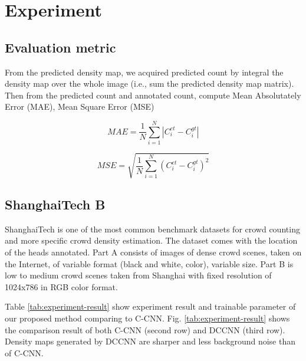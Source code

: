 \section{Experiment} \label{sec:experiment}

\subsection{Evaluation metric}


From the predicted density map, we acquired predicted count by integral the density map over the whole image (i.e., sum the predicted density map matrix). Then from the predicted count and annotated count, compute Mean Absolutately Error (MAE), Mean Square Error (MSE) 

\begin{equation}M A E=\frac{1}{N} \sum_{i=1}^{N}\left|C_{i}^{e t}-C_{i}^{g t}\right|\end{equation}

\begin{equation}M S E=\sqrt{\frac{1}{N} \sum_{i=1}^{N}\left(C_{i}^{e t}-C_{i}^{g t}\right)^{2}}\end{equation}

\subsection{ShanghaiTech B} \label{sec:shb_result}
 


ShanghaiTech \cite{zhang2016single} is one of the most common benchmark datasets for crowd counting and more specific crowd density estimation. The dataset comes with the location of the heads annotated. Part A consists of images of dense crowd scenes, taken on the Internet, of variable format (black and white, color), variable size. Part B is low to medium crowd scenes taken from Shanghai with fixed resolution of 1024x786 in RGB color format. 

Table \ref{tab:experiment-result} show experiment result and trainable parameter of our proposed method comparing to C-CNN. Fig. \ref{tab:experiment-result} shows the comparison result of both C-CNN (second row) and DCCNN (third row). Density maps generated by DCCNN are sharper and less background noise than of C-CNN.

